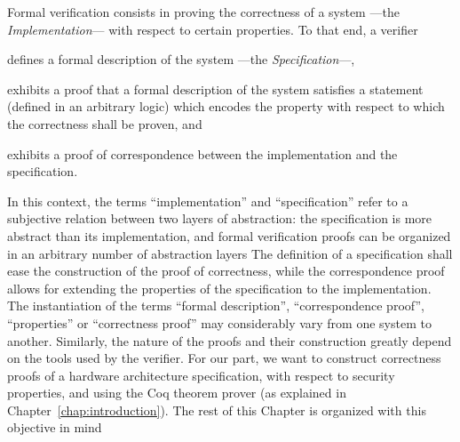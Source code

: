 \documentclass[oneside,a4paper]{memoir}
\begin{document}
%

Formal verification consists in proving the correctness of a system ---the
\emph{Implementation}--- with respect to certain properties.
%
To that end, a verifier
%
\begin{inparaenum}[(1)]
\item defines a formal description of the system ---the \emph{Specification}---,
\item exhibits a proof that a formal description of the system satisfies a
  statement (defined in an arbitrary logic) which encodes the property with
  respect to which the correctness shall be proven, and
\item exhibits a proof of correspondence between the implementation and the
  specification.
\end{inparaenum}
%
In this context, the terms ``implementation'' and ``specification'' refer to a
subjective relation between two layers of abstraction: the specification is more
abstract than its implementation, and formal verification proofs can be
organized in an arbitrary number of abstraction layers
%
The definition of a specification shall ease the construction of the proof of
correctness, while the correspondence proof allows for extending the properties
of the specification to the implementation.
%
The instantiation of the terms ``formal description'', ``correspondence proof'',
``properties'' or ``correctness proof'' may considerably vary from one system to
another.
%
Similarly, the nature of the proofs and their construction greatly depend on the
tools used by the verifier.
%
For our part, we want to construct correctness proofs of a hardware architecture
specification, with respect to security properties, and using the Coq theorem
prover (as explained in Chapter~\ref{chap:introduction}).
%
The rest of this Chapter is organized with this objective in mind
\end{document}
